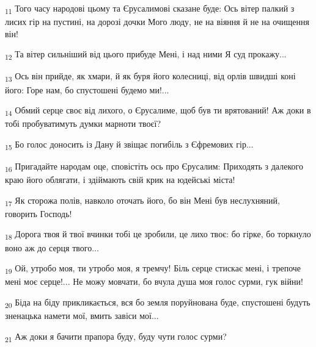 \begin{tcolorbox}
\textsubscript{11} Того часу народові цьому та Єрусалимові сказане буде: Ось вітер палкий з лисих гір на пустині, на дорозі дочки Мого люду, не на віяння й не на очищення він!
\end{tcolorbox}
\begin{tcolorbox}
\textsubscript{12} Та вітер сильніший від цього прибуде Мені, і над ними Я суд прокажу...
\end{tcolorbox}
\begin{tcolorbox}
\textsubscript{13} Ось він прийде, як хмари, й як буря його колесниці, від орлів швидші коні його: Горе нам, бо спустошені будемо ми!...
\end{tcolorbox}
\begin{tcolorbox}
\textsubscript{14} Обмий серце своє від лихого, о Єрусалиме, щоб був ти врятований! Аж доки в тобі пробуватимуть думки марноти твоєї?
\end{tcolorbox}
\begin{tcolorbox}
\textsubscript{15} Бо голос доносить із Дану й звіщає погибіль з Єфремових гір...
\end{tcolorbox}
\begin{tcolorbox}
\textsubscript{16} Пригадайте народам оце, сповістіть ось про Єрусалим: Приходять з далекого краю його облягати, і здіймають свій крик на юдейські міста!
\end{tcolorbox}
\begin{tcolorbox}
\textsubscript{17} Як сторожа полів, навколо оточать його, бо він Мені був неслухняний, говорить Господь!
\end{tcolorbox}
\begin{tcolorbox}
\textsubscript{18} Дорога твоя й твої вчинки тобі це зробили, це лихо твоє: бо гірке, бо торкнуло воно аж до серця твого...
\end{tcolorbox}
\begin{tcolorbox}
\textsubscript{19} Ой, утробо моя, ти утробо моя, я тремчу! Біль серце стискає мені, і трепоче мені моє серце!... Не можу мовчати, бо вчула душа моя голос сурми, гук війни!
\end{tcolorbox}
\begin{tcolorbox}
\textsubscript{20} Біда на біду прикликається, вся бо земля поруйнована буде, спустошені будуть зненацька намети мої, вмить завіси мої...
\end{tcolorbox}
\begin{tcolorbox}
\textsubscript{21} Аж доки я бачити прапора буду, буду чути голос сурми?
\end{tcolorbox}

